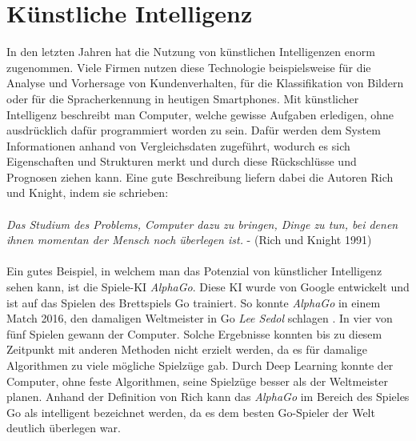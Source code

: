 \section{Künstliche Intelligenz}\label{s.ki}
In den letzten Jahren hat die Nutzung von künstlichen Intelligenzen enorm zugenommen. Viele Firmen nutzen diese Technologie beispielsweise für die Analyse und Vorhersage von Kundenverhalten, für die Klassifikation von Bildern oder für die Spracherkennung in heutigen Smartphones. Mit künstlicher Intelligenz beschreibt man Computer, welche gewisse Aufgaben erledigen, ohne ausdrücklich dafür programmiert worden zu sein. Dafür werden dem System Informationen anhand von Vergleichsdaten zugeführt, wodurch es sich Eigenschaften und Strukturen merkt und durch diese Rückschlüsse und Prognosen ziehen kann. Eine gute Beschreibung liefern dabei die Autoren Rich und Knight, indem sie schrieben:\\\\
 \textit{Das Studium des Problems, Computer dazu zu bringen, Dinge zu tun, bei denen ihnen momentan der Mensch noch überlegen ist.} - (Rich und Knight 1991) \cite[231]{kuppers2017humanoide}\\\\
Ein gutes Beispiel, in welchem man das Potenzial von künstlicher Intelligenz sehen kann, ist die Spiele-KI  \textit{AlphaGo}. Diese KI wurde von Google entwickelt und ist auf das Spielen des Brettspiels Go trainiert. So konnte \textit{AlphaGo} in einem Match 2016, den damaligen Weltmeister in Go \textit{Lee Sedol} schlagen \cite{Alpha2016GO}. In vier von fünf Spielen gewann der Computer. Solche Ergebnisse konnten bis zu diesem Zeitpunkt mit anderen Methoden nicht erzielt werden, da es für damalige Algorithmen zu viele mögliche Spielzüge gab. Durch Deep Learning konnte der Computer, ohne feste Algorithmen, seine Spielzüge besser als der Weltmeister planen. Anhand der Definition von Rich kann das  \textit{AlphaGo}  im Bereich des Spieles Go als intelligent bezeichnet werden, da es dem besten Go-Spieler der Welt deutlich überlegen war.
